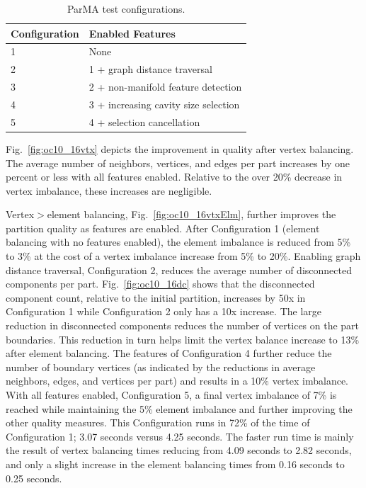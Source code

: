 \begin{table} \centering
  \footnotesize
  \caption{
    ParMA test configurations.
  }
  \label{tbl:oceanConfigs}
  \begin{tabular}{l | l }
    Configuration & Enabled Features \\
    \hline
    1             & None \\
    \hline
    2             & 1 + graph distance traversal\\
    \hline
    3             & 2 + non-manifold feature detection\\
    \hline
    4             & 3 + increasing cavity size selection\\
    \hline
    5             & 4 + selection cancellation \\
  \end{tabular}
\end{table}

Fig.~\ref{fig:oc10_16vtx} depicts the improvement in quality after vertex
balancing.
The average number of neighbors, vertices, and edges per part increases by one
percent or less with all features enabled.
Relative to the over 20\% decrease in vertex imbalance, these increases are
negligible.




Vertex$>$element balancing, Fig.~\ref{fig:oc10_16vtxElm}, further improves
the partition quality as features are enabled.
After Configuration 1 (element balancing with no features enabled), the element
imbalance is reduced from 5\% to 3\% at the cost of a vertex imbalance increase
from 5\% to 20\%.
Enabling graph distance traversal, Configuration 2, reduces the average
number of disconnected components per part.
Fig.~\ref{fig:oc10_16dc} shows that the disconnected component count,
relative to the initial partition, increases by 50x in Configuration 1 while
Configuration 2 only has a 10x increase.
The large reduction in disconnected components reduces the number of vertices on
the part boundaries.
This reduction in turn helps limit the vertex balance increase to 13\% after
element balancing.
The features of Configuration 4 further reduce the number
of boundary vertices (as indicated by the reductions in average neighbors,
edges, and vertices per part) and results in a 10\% vertex imbalance.
With all features enabled, Configuration 5, a final vertex imbalance of 7\% is
reached while maintaining the 5\% element imbalance and further improving
the other quality measures.
This Configuration runs in 72\% of the time of Configuration 1; 3.07 seconds versus
4.25 seconds.
The faster run time is mainly the result of vertex balancing times reducing from
4.09 seconds to 2.82 seconds, and only a slight increase in the element
balancing times from 0.16 seconds to 0.25 seconds.


